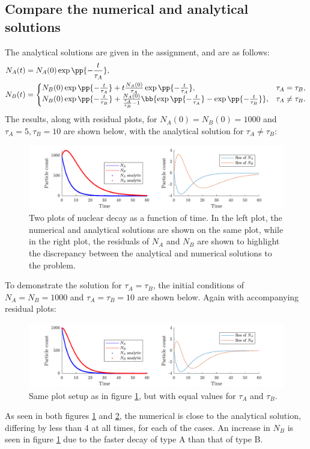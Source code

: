\documentclass[a4paper,10pt]{article} 	%
\numberwithin{equation}{section}
\begin{document}
	\subsection{Compare the numerical and analytical solutions}
	The analytical solutions are given in the assignment, and are as follows:
	\begin{align}
		N_A(t) &= N_A(0) \exp\pp{-\frac{t}{\tau_A}}, \\
		N_B(t) &= \begin{cases}
		N_B(0) \exp\pp{-\frac{t}{\tau_A}} + t \frac{N_A(0)}{\tau_A} \exp\pp{-\frac{t}{\tau_A}}, & \tau_A= \tau_B, \\
		N_B(0) \exp\pp{-\frac{t}{\tau_B}} + \frac{N_A(0)}{\frac{\tau_A}{\tau_B} - 1} \bb{\exp\pp{-\frac{t}{\tau_A}} - \exp\pp{-\frac{t}{\tau_B}}}, & \tau_A \neq \tau_B.
		\end{cases}
	\end{align}	
	The results, along with residual plots, for $ N_A(0) = N_B(0) = 1000 $ and $ \tau_A = 5, \tau_B = 10 $ are shown below, with the analytical solution for $ \tau_A \neq \tau_B $:
	\begin{figure}[H]
		\centering
		\includegraphics[width=\linewidth]{unequaltau.pdf}
		\caption{Two plots of nuclear decay as a function of time. In the left plot, the numerical and analytical solutions are shown on the same plot, while in the right plot, the residuals of $ N_A $ and $ N_B $ are shown to highlight the discrepancy between the analytical and numerical solutions to the problem.}
		\label{fig:unequalTau}
	\end{figure}
	To demonstrate the solution for $ \tau_A = \tau_B $, the initial conditions of $ N_A=N_B = 1000 $ and $ \tau_A=\tau_B = 10 $ are shown below. Again with accompanying residual plots:
	\begin{figure}[H]
		\centering
		\includegraphics[width=\linewidth]{equaltau.pdf}
		\caption{Same plot setup as in figure \ref{fig:unequalTau}, but with equal values for $ \tau_A $ and $ \tau_B $.}
		\label{fig:equalTau}
	\end{figure}
	As seen in both figures \ref{fig:unequalTau} and \ref{fig:equalTau}, the numerical is close to the analytical solution, differing by less than 4 at all times, for each of the cases. An increase in $ N_B $ is seen in figure \ref{fig:unequalTau} due to the faster decay of type A than that of type B.
 	
\end{document}
